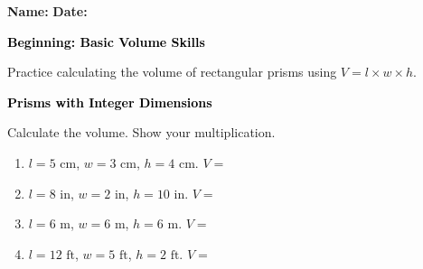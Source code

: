 \documentclass[12pt, letterpaper, fleqn]{article}
\newcommand{\blank}{\underline{\hspace{2.2cm}}}
\begin{document}
\textbf{Name:} \underline{\hspace{5cm}}
\hfill
\textbf{Date:} \underline{\hspace{3cm}}\\

\begin{tcolorbox}[colback=black!10]
    \large\textcolor{black}{\textbf{Beginning: Basic Volume Skills}}
\end{tcolorbox}

\vspace{3mm}

\noindent
Practice calculating the volume of rectangular prisms using $V = l \times w \times h$.

\vspace{4mm}

\begin{tcolorbox}[colback=black!10]
\large\textcolor{black}{\textbf{Prisms with Integer Dimensions}}
\end{tcolorbox}

\noindent
Calculate the volume. Show your multiplication.

\vspace{3mm}

\begin{enumerate}[itemsep=2.2cm, leftmargin=0.6cm]

\item $l = 5\text{ cm}$, $w = 3\text{ cm}$, $h = 4\text{ cm}$. \quad $V =$ \blank

\vspace{1.5cm}

\item $l = 8\text{ in}$, $w = 2\text{ in}$, $h = 10\text{ in}$. \quad $V =$ \blank

\vspace{1.5cm}

\item $l = 6\text{ m}$, $w = 6\text{ m}$, $h = 6\text{ m}$. \quad $V =$ \blank

\vspace{1.5cm}

\item $l = 12\text{ ft}$, $w = 5\text{ ft}$, $h = 2\text{ ft}$. \quad $V =$ \blank

\vspace{1.5cm}

\end{enumerate}
\end{document}
